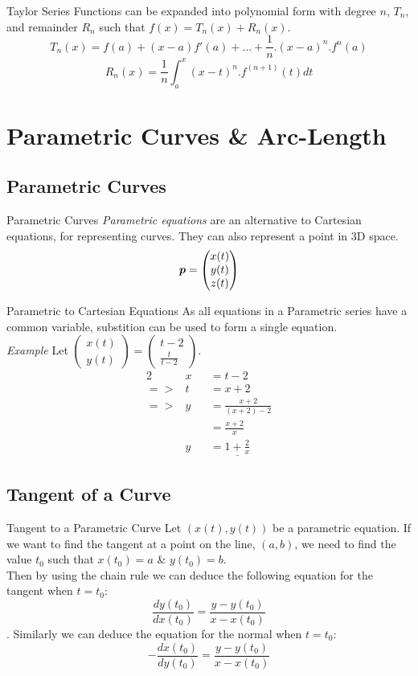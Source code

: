 \documentclass[11pt,a4paper]{article}
\begin{document}
\subtitle{Theorem 4.06 - }{Taylor Series}
Functions can be expanded into polynomial form with degree $n$, $T_n$, and remainder $R_n$ such that $f(x) = T_n(x) + R_n(x)$.
$$T_n(x) = f(a) + (x-a)f'(a) + ... + \frac{1}{n}.(x-a)^n.f^n(a)$$
$$R_n(x) = \frac{1}{n} \int_{a}^{x} (x-t)^n.f^{(n+1)}(t) dt$$

\section{Parametric Curves \& Arc-Length}
%
\subsection{Parametric Curves}
%
\subtitle{Definition 5.01 - }{Parametric Curves}
\textit{Parametric equations} are an alternative to Cartesian equations, for representing curves. They can also represent a point in 3D space.
$$\boldsymbol{p} = \begin{pmatrix} x(t)\\ y(t)\\ z(t) \end{pmatrix}$$

\subtitle{Theorem 5.02 - }{Parametric to Cartesian Equations}
As all equations in a Parametric series have a common variable, substition can be used to form a single equation. \\
\textit{Example} Let $\begin{pmatrix} x(t) \\ y(t) \end{pmatrix} = \begin{pmatrix} t-2 \\ \frac{t}{t-2} \end{pmatrix}$.
\begin{alignat*}{2}
  &x &&= t - 2 \\
  =>&t &&= x + 2 \\
  =>&y &&= \frac{x+2}{(x+2) - 2} \\
  & &&= \frac{x+2}{x} \\
  & y &&= \underline{1 + \frac{2}{x}}
\end{alignat*}

\subsection{Tangent of a Curve}
%
\subtitle{Theorem 5.02 - }{Tangent to a Parametric Curve}
Let $(x(t), y(t))$ be a parametric equation. If we want to find the tangent at a point on the line, $(a, b)$, we need to find the value $t_0$ such that $x(t_0) = a$ \& $y(t_0) = b$. \\
Then by using the chain rule we can deduce the following equation for the tangent when $t = t_0$: $$\frac{dy(t_0)}{dx(t_0)} = \frac{y - y(t_0)}{x - x(t_0)}$$.
Similarly we can deduce the equation for the normal when $t = t_0$: $$-\frac{dx(t_0)}{dy(t_0)} = \frac{y - y(t_0)}{x - x(t_0)}$$
\end{document}
